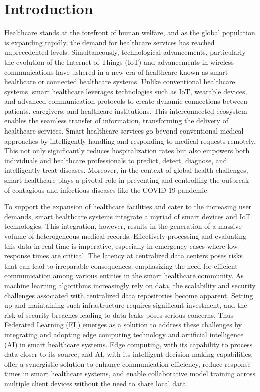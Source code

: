 \documentclass[conference]{IEEEtran}
\begin{document}
\section{Introduction}

Healthcare stands at the forefront of human welfare, and as the global population is expanding rapidly, the demand for healthcare services has reached unprecedented levels. Simultaneously, technological advancements, particularly the evolution of the Internet of Things (IoT) and advancements in wireless communications have ushered in a new era of healthcare known as smart healthcare\cite{1} or connected healthcare systems. Unlike conventional healthcare systems, smart healthcare leverages technologies such as IoT, wearable devices, and advanced communication protocols to create dynamic connections between patients, caregivers, and healthcare institutions. This interconnected ecosystem enables the seamless transfer of information, transforming the delivery of healthcare services. Smart healthcare services go beyond conventional medical approaches by intelligently handling and responding to medical requests remotely. This not only significantly reduces hospitalization rates but also empowers both individuals and healthcare professionals to predict, detect, diagnose, and intelligently treat diseases. Moreover, in the context of global health challenges, smart healthcare plays a pivotal role in preventing and controlling the outbreak of contagious and infectious diseases like the COVID-19 pandemic.

To support the expansion of healthcare facilities and cater to the increasing user demands, smart healthcare systems integrate a myriad of smart devices and IoT technologies. This integration, however, results in the generation of a massive volume of heterogeneous medical records. Effectively processing and evaluating this data in real time is imperative, especially in emergency cases where low response times are critical. The latency at centralized data centers poses risks that can lead to irreparable consequences, emphasizing the need for efficient communication among various entities in the smart healthcare community. As machine learning algorithms increasingly rely on data, the scalability and security challenges associated with centralized data repositories become apparent. Setting up and maintaining such infrastructure requires significant investment, and the risk of security breaches leading to data leaks poses serious concerns. Thus Federated Learning (FL) emerges as a solution to address these challenges by integrating and adopting edge computing technology and artificial intelligence (AI)\cite{2} in smart healthcare systems. Edge computing, with its capability to process data closer to its source, and AI, with its intelligent decision-making capabilities, offer a synergistic solution to enhance communication efficiency, reduce response times in smart healthcare systems, and enable collaborative model training across multiple client devices without the need to share local data. 
\end{document}

